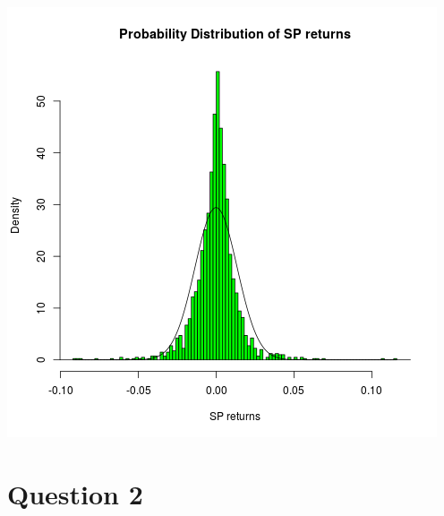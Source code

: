 \documentclass{article}
\begin{document}
\includegraphics{"plota4"}
\pagebreak

\section{Question 2}

\end{document}

